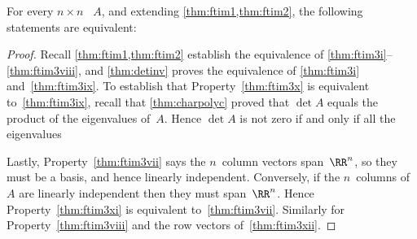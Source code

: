 \begin{theorem} \label{thm:ftim3} 
For every \(n\times n\) ~\(A\), and  
extending \cref{thm:ftim1,thm:ftim2}, the following statements are equivalent:
\end{theorem}
\begin{proof} 
Recall \cref{thm:ftim1,thm:ftim2} establish the equivalence of \ref{thm:ftim3i}--\ref{thm:ftim3viii}, and \cref{thm:detinv} proves the equivalence of \ref{thm:ftim3i} and~\ref{thm:ftim3ix}.
To establish that Property~\ref{thm:ftim3x} is equivalent to~\ref{thm:ftim3ix}, recall that \cref{thm:charpolyc} proved that \(\det A\) equals the product of the eigenvalues of~\(A\). 
Hence  \(\det A\) is not zero if and only if all the eigenvalues 

Lastly, Property~\ref{thm:ftim3vii} says the \(n\)~column vectors span~\(\RR^n\), so they must be a basis, and hence linearly independent.
Conversely, if the \(n\)~columns of~\(A\) are linearly independent then they must span~\(\RR^n\).  
Hence Property~\ref{thm:ftim3xi} is equivalent to~\ref{thm:ftim3vii}.
Similarly  for Property~\ref{thm:ftim3viii} and the row vectors of~\ref{thm:ftim3xii}.
\end{proof}


